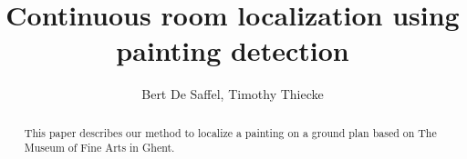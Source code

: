 \documentclass[10pt,final,journal]{IEEEtran}
\title{Continuous room localization using painting detection}
\author{Bert De Saffel, Timothy Thiecke}
\begin{document}
	\maketitle
	\begin{abstract}
		
		This paper describes our method to localize a painting on a ground plan based on The Museum of Fine Arts in Ghent. 
	\end{abstract}

	
	
	
	
	

	
	
\end{document}
